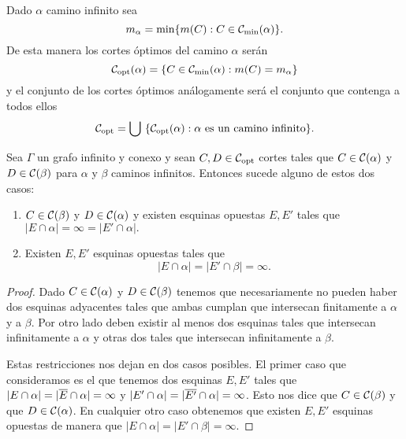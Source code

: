 \documentclass[tesis.tex]{subfiles}
\begin{document}
\begin{deff}
	Dado $\alpha$ camino infinito sea
	\[
		m_\alpha = \min \{ m(C) : C \in {\cal C}_{\text{min}}(\alpha) \}.
	\]
	De esta manera los cortes óptimos del camino $\alpha$ serán
	\[
		{\cal C}_{\text{opt}}(\alpha) = \{ C \in {\cal C}_{\text{min}}(\alpha) : m(C) = m_\alpha  \}
	\]
	y el conjunto de los cortes óptimos análogamente será el conjunto que contenga a todos ellos
	\[
		{\cal C}_{\text{opt}} = \bigcup \ \{ {\cal C}_{\text{opt}}(\alpha) : \alpha \ \text{es un camino infinito}  \}.
	\]
\end{deff}

\begin{lema}\label{lema_esquinas_caminos}
	
	Sea $\Gamma$ un grafo infinito y conexo y sean $C,D \in {\cal C}_{\text{opt}}$ cortes tales que $C \in {\cal C}(\alpha)$ y $D \in {\cal C}(\beta)$ para $\alpha$ y $\beta$ caminos infinitos.
	Entonces sucede alguno de estos dos casos:
	\begin{enumerate}
		\item $C \in {\cal C}(\beta)$ y $D \in {\cal C}(\alpha)$ y existen esquinas opuestas $E, E'$ tales que $|E \cap \alpha| = \infty = |E' \cap \alpha|.$
		
		\item Existen $E, E'$ esquinas opuestas tales que
		\[
		|E \cap \alpha| = |E' \cap \beta | = \infty. 
		\]
		
	\end{enumerate}
\end{lema}
\begin{proof}
	Dado $C \in {\cal C}(\alpha)$ y $D \in {\cal C}(\beta)$ tenemos que necesariamente no pueden haber dos esquinas adyacentes tales que ambas cumplan que intersecan finitamente a $\alpha$ y a $\beta$.
	Por otro lado deben existir al menos dos esquinas tales que intersecan infinitamente a $\alpha$ y otras dos tales que intersecan infinitamente a $\beta$. 
	
	Estas restricciones nos dejan en dos casos posibles.
	El primer caso que consideramos es el que tenemos dos esquinas $E, E'$ tales que $|E \cap \alpha| = |\overline{E} \cap \alpha| = \infty$ y $|E' \cap \alpha| = |\overline{E'} \cap \alpha|=\infty$.
	Esto nos dice que $C \in {\cal C}(\beta)$ y que $D \in {\cal C}(\alpha)$.
	En cualquier otro caso obtenemos que existen $E,E'$ esquinas opuestas de manera que $|E \cap \alpha| = |E' \cap \beta | = \infty$.
	
\end{proof}
\end{document}
